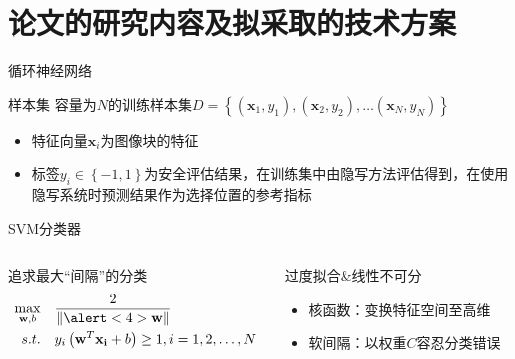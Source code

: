 \documentclass[14pt]{Bredelebeamer}
\begin{document}
\section{论文的研究内容及拟采取的技术方案}



\begin{frame}{循环神经网络}
	\begin{block}{样本集}
		容量为$N$的训练样本集$D = \left\{ {\left( {{{\mathbf{x}}_1},{y_1}} \right),\left( {{{\mathbf{x}}_2},{y_2}} \right), \ldots \left( {{{\mathbf{x}}_N},{y_N}} \right)} \right\}$
    \pause
		\begin{itemize}
			\item 特征向量${\mathbf{x}_i}$为图像块的特征
      \pause
			\item 标签$y_i \in \left\{ -1,1\right\}$为安全评估结果，在训练集中由隐写方法评估得到，在使用隐写系统时预测结果作为选择位置的参考指标
		\end{itemize}
	\end{block}
\pause
	\begin{alertblock}{SVM分类器}
			\begin{columns}
			\begin{column}{.5\textwidth}
		追求最大\alert<4>{“间隔”}的分类
		$$
		\begin{aligned}
		\mathop {\max }\limits_{{\mathbf{w}},b} & \quad\frac{2}{{\left\| {\alert<4>{\mathbf{w}}} \right\|}} \\
		s.t. &\quad {y_i}  \left( {{{\mathbf{w}}^T}{\mathbf{x_i}} + b} \right) \ge 1,i = 1,2, \ldots ,N
		\end{aligned}$$
			\end{column}
      \pause
					\begin{column}{.41\textwidth}
						过度拟合\&线性不可分
						\begin{itemize}
              \pause
							\item 核函数：变换特征空间至高维
              \pause
							\item 软间隔：以权重$C$容忍分类错误
						\end{itemize}
						\end{column}
		\end{columns}
	\end{alertblock}
\end{frame}
\end{document}
